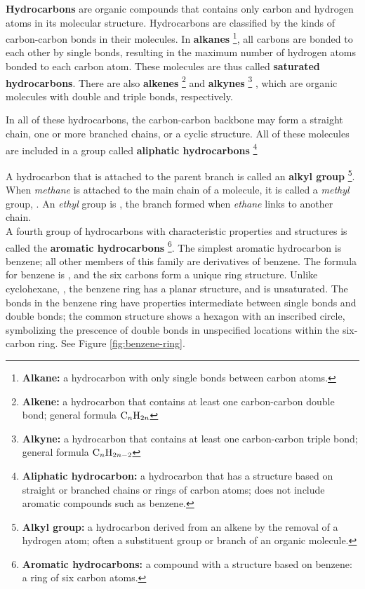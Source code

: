 \textbf{Hydrocarbons} are organic compounds that contains only carbon and hydrogen atoms in its
molecular structure. Hydrocarbons are classified by the kinds of carbon-carbon bonds in their
molecules. In \textbf{alkanes}
\footnote{
    \textbf{Alkane:} a hydrocarbon with only single bonds between carbon atoms.
},
all carbons are bonded to each other by single bonds, resulting in the maximum number of hydrogen
atoms bonded to each carbon atom. These molecules are thus called \textbf{saturated hydrocarbons}.
There are also \textbf{alkenes}
\footnote{
    \textbf{Alkene:} a hydrocarbon that contains at least one carbon-carbon double bond; general
    formula $\ch{C_nH_{2n}}$
}
and \textbf{alkynes}
\footnote{
    \textbf{Alkyne:} a hydrocarbon that contains at least one carbon-carbon triple bond;
    general formula $\ch{C_nH_{2n-2}}$
}
, which are organic molecules with double and
triple bonds, respectively.

\begin{important}
    In all of these hydrocarbons, the carbon-carbon backbone may form a straight chain, one or more
    branched chains, or a cyclic structure. All of these molecules are included in a group called
    \textbf{aliphatic hydrocarbons}
    \footnote{
        \textbf{Aliphatic hydrocarbon:} a hydrocarbon that has a structure based on straight or
        branched chains or rings of carbon atoms; does not include aromatic compounds such as benzene.
    }
\end{important}
A hydrocarbon that is attached to the parent branch is called an \textbf{alkyl group}
\footnote{
    \textbf{Alkyl group:} a hydrocarbon derived from an alkene by the removal of a hydrogen atom;
    often a substituent group or branch of an organic molecule.
}.
When \textit{methane} is attached to the main chain of a molecule, it is called a \textit{methyl}
group, . An \textit{ethyl} group is , the branch formed when \textit{ethane}
links to another chain. \\

A fourth group of hydrocarbons with characteristic properties and structures is called the
\textbf{aromatic hydrocarbons}
\footnote{
    \textbf{Aromatic hydrocarbons:} a compound with a structure based on benzene: a ring of six
    carbon atoms.
}.
The simplest aromatic hydrocarbon is benzene; all other members of this family are derivatives
of benzene. The formula for benzene is , and the six carbons form a unique ring structure.
Unlike cyclohexane, , the benzene ring has a planar structure, and is unsaturated.
The bonds in the benzene ring have properties intermediate between single bonds and double bonds;
the common structure shows a hexagon with an inscribed circle, symbolizing the prescence of double
bonds in unspecified locations within the six-carbon ring. See Figure \ref{fig:benzene-ring}.

